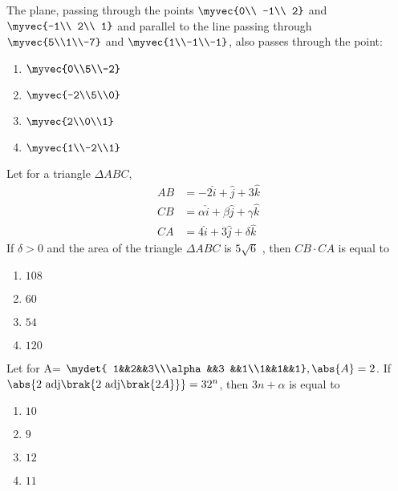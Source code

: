 \item The plane, passing through the points $\myvec{0\\ -1\\ 2}$ and $\myvec{-1\\ 2\\ 1}$ and parallel to the line passing through $\myvec{5\\1\\-7}$ and $\myvec{1\\-1\\-1}$, also passes through the point:\hfill{}

\begin{multicols}{4}
\begin{enumerate}
\item $\myvec{0\\5\\-2}$
\item $\myvec{-2\\5\\0}$
\item $\myvec{2\\0\\1}$
\item $\myvec{1\\-2\\1}$
\end{enumerate}
\end{multicols}

\item Let for a triangle $\Delta ABC$,
\begin{align*}
AB &= -2\hat{i} +\hat{j} +3\hat{k} \\
CB &= \alpha \hat{i} +\beta \hat{j} +\gamma \hat{k}\\
CA &= 4\hat{i} +3\hat{j} +\delta \hat{k}
\end{align*}
If $\delta >0$ and the area of the triangle $\Delta ABC$ is $5\sqrt{6}$ , then $CB \cdot CA $ is equal to
	
		\hfill{}

\begin{multicols}{4}
\begin{enumerate}
\item $108$
\item $60$
\item $54$
\item $120$
\end{enumerate}
\end{multicols}

\item Let for A= $\mydet{ 1&&2&&3\\\alpha&&3 &&1\\1&&1&&1} , \abs{A}=2$. If
$\abs{2\text{ adj}\brak{2\text{ adj}\brak{2A}}}=32^n$, then $3n+\alpha$ is equal to\hfill{}
\begin{multicols}{4}
\begin{enumerate}
\item $10$
\item $9$
\item $12$
\item $11$
\end{enumerate}
\end{multicols}

